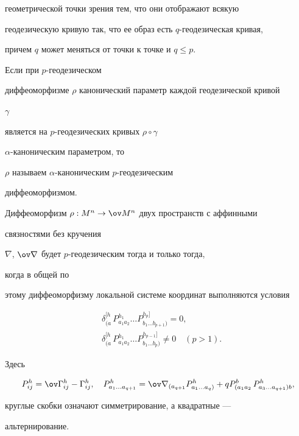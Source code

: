 геометрической точки зрения тем, что они отображают всякую


геодезическую кривую так, что ее образ есть $q$-геодезическая кривая,


причем $q$ может меняться от точки к точке и $q\le p$.


Если при $p$-геодезическом


диффеоморфизме $\rho$ канонический параметр каждой геодезической кривой


$\gamma$


является на $p$-геодезических кривых $\rho\circ\gamma$\;


$\alpha$-каноническим параметром, то


$\rho$ называем $\alpha$-каноническим $p$-геодезическим


диффеоморфизмом.





Диффеоморфизм $\rho:M^n\to\ov M{}^n$ двух пространств с аффинными


связностями без кручения


$\nabla$, $\ov\nabla$ будет $p$-геодезическим тогда и только тогда,


когда в общей по


этому диффеоморфизму локальной системе координат выполняются условия


\begin{align}


& \delta^{[h}_{(a}\,P^{h_1}_{a_1a_2}\dots


P^{h_p]}_{b_1\dots b_{p+1})}=0, \\


%


& \delta^{[h}_{(a}\,P^{h_1}_{a_1a_2}\dots


P^{h_{p-1}]}_{b_1\dots b_p)}\ne 0\quad (p>1).


\end{align}


Здесь


$$


P^h_{ij}=\ov\Gamma{}^h_{ij}-\Gamma^h_{ij},\quad


P^h_{a_1\dots a_{q+1}}=\ov\nabla{}_{(a_{q+1}}


P^h_{a_1\dots a_{q})}+q P^b_{(a_1a_2}\,


P^h_{a_3\dots a_{q+1})b},


$$


круглые скобки означают симметрирование, а квадратные ---


альтернирование.





